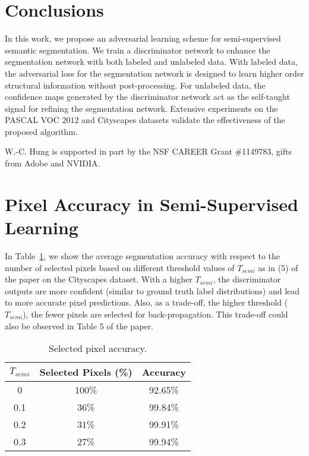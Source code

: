 \documentclass{bmvc2k}
\begin{document}
	\vspace{-4mm}
	\section{Conclusions}
	\vspace{-3mm}
	In this work, we propose an adversarial learning scheme for semi-supervised semantic segmentation.
	We train a discriminator network to enhance the segmentation network with both labeled and unlabeled data. With labeled data, the adversarial loss for the segmentation network is designed to learn higher order structural information without post-processing.
	For unlabeled data, the confidence maps generated by the discriminator network act as the self-taught signal for refining the segmentation network.
	Extensive experiments on the PASCAL VOC 2012 and Cityscapes datasets validate the effectiveness of the proposed algorithm.
	
	{}
	W.-C. Hung is supported in part by the NSF CAREER Grant \#1149783, gifts from Adobe and NVIDIA.
	
	
	
	\clearpage
	\appendix
	
	\section{Pixel Accuracy in Semi-Supervised Learning}
	
	In Table~\ref{table:secmi_acc}, we show the average segmentation accuracy with respect to the number of selected pixels based on different threshold values of $T_{semi}$ as in (5) of the paper on the Cityscapes dataset. 
	With a higher $T_{semi}$, the discriminator outputs are more confident (similar to ground truth label distributions) and lead to more accurate pixel predictions.
	Also, as a trade-off, the higher threshold ($T_{semi}$), the fewer pixels are selected for back-propagation. This trade-off could also be observed in Table 5 of the paper.
	
	\begin{table}[h]
		\caption{Selected pixel accuracy.}
		\centering
		\label{table:secmi_acc}
		\begin{tabular}{c|c|c}
			\toprule
			$T_{semi}$ & Selected Pixels (\%) & Accuracy \\
			\midrule
			0 & 100\% & 92.65\%\\
			0.1 & 36\% & 99.84\% \\
			0.2 & 31\% & 99.91\% \\
			0.3 & 27\% & 99.94\% \\ 
			\bottomrule
		\end{tabular}
		
	\end{table}
\end{document}
